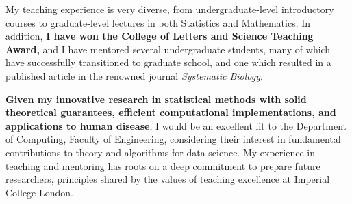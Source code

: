 \documentclass[10pt,a4paper,sans]{moderncv}
\newcommand{\university}{Imperial College London}
\newcommand{\department}{Department of Computing, Faculty of Engineering}
\begin{document}
My teaching experience is very diverse, from undergraduate-level
introductory courses to graduate-level lectures in both Statistics and
Mathematics. In addition, \textbf{I have won the College of Letters
  and Science Teaching Award,} and I have mentored several
undergraduate students, many of which have successfully transitioned
to graduate school, and one which resulted in a published article in
the renowned journal \textit{Systematic Biology}.

\textbf{Given my innovative research in statistical methods with solid
  theoretical guarantees, efficient computational implementations, and
  applications to human disease}, I would be an excellent fit to
the \department{}, considering their interest in fundamental
contributions to theory and algorithms for data science.
My experience in teaching and
mentoring has roots on a deep commitment to prepare future
researchers, principles shared by the values of teaching excellence at
\university{}.

\makeletterclosing
\end{document}
